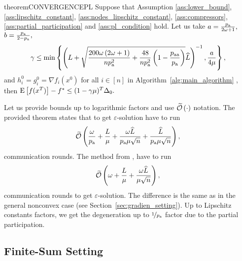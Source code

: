 \documentclass{article}
\newcommand{\algorithmname}{DARIA}
\newcommand*{\probavailable}{\ensuremath{p_{\textnormal{a}}}}
\newcommand*{\probpairaa}{\ensuremath{p_{\textnormal{aa}}}}
\begin{document}
\begin{restatable}{theorem}{CONVERGENCEPL}
  \label{theorem:gradient_oracle_pl}
  Suppose that Assumption \ref{ass:lower_bound}, \ref{ass:lipschitz_constant}, \ref{ass:nodes_lipschitz_constant}, \ref{ass:compressors}, \ref{ass:partial_participation} and \ref{ass:pl_condition} hold. Let us take $a = \frac{\probavailable}{2 \omega + 1},$ $b = \frac{\probavailable}{2 - \probavailable},$ 
  $$\gamma \leq \min\left\{\left(L + \sqrt{\frac{200 \omega \left(2 \omega + 1\right)}{n \probavailable^2} + \frac{48}{n \probavailable^2}\left(1 - \frac{\probpairaa}{\probavailable}\right)}\widehat{L}\right)^{-1}, \frac{a}{4\mu}\right\}, $$ 
  and $h^{0}_i = g^{0}_i = \nabla f_i(x^0)$ for all $i \in [n]$ in Algorithm~\ref{alg:main_algorithm} \algname{(\algorithmname)},
  then ${\rm E}\left[f(x^{T})\right] - f^* \leq (1 - \gamma \mu)^{T} \Delta_0.$
\end{restatable}

Let us provide bounds up to logarithmic factors and use $\widetilde{\mathcal{O}}\left(\cdot\right)$ notation. The provided theorem states that to get $\varepsilon$-solution \algname{\algorithmname} have to run
\begin{align*}
  \widetilde{\cO}\left(\frac{\omega}{\probavailable} + \frac{L}{\mu} + \frac{\omega \widehat{L}}{\probavailable \mu \sqrt{n}} + \frac{\widehat{L}}{\probavailable \mu \sqrt{n}}\right),
\end{align*}
communication rounds. The method  from \citep{tyurin2022dasha}, have to run
\begin{align*}
  \widetilde{\mathcal{O}}\left(\omega + \frac{L}{\mu} + \frac{\omega \widehat{L}}{\mu \sqrt{n}}\right),
\end{align*}
communication rounds to get $\varepsilon$-solution. The difference is the same as in the general nonconvex case (see Section~\ref{sec:gradien_setting}). Up to Lipschitz constants factors, we get the degeneration up to $\nicefrac{1}{\probavailable}$ factor due to the partial participation.

\subsection{Finite-Sum Setting}
\end{document}
